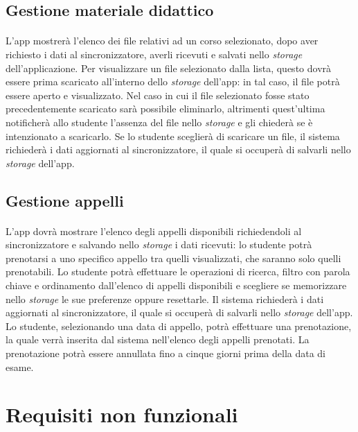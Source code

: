 \subsection{Gestione materiale didattico}
\paragraph{} 
L’app mostrerà l’elenco dei file relativi ad un corso selezionato, dopo aver richiesto i dati al sincronizzatore, averli ricevuti e salvati nello \textit{storage} dell’applicazione. Per visualizzare un file selezionato dalla lista, questo dovrà essere prima scaricato all’interno dello \textit{storage} dell’app: in tal caso, il file potrà essere aperto e visualizzato. Nel caso in cui il file selezionato fosse stato precedentemente scaricato sarà possibile eliminarlo, altrimenti quest’ultima notificherà allo studente l’assenza del file nello \textit{storage} e gli chiederà se è intenzionato a scaricarlo. Se lo studente sceglierà di scaricare un file, il sistema richiederà i dati aggiornati al sincronizzatore, il quale si occuperà di salvarli nello \textit{storage} dell’app.
\subsection{Gestione appelli}
\paragraph{} 
L’app dovrà mostrare l’elenco degli appelli disponibili richiedendoli al sincronizzatore e salvando nello \textit{storage} i dati ricevuti: lo studente potrà prenotarsi a uno specifico appello tra quelli visualizzati, che saranno solo quelli prenotabili. Lo studente potrà effettuare le operazioni di ricerca, filtro con parola chiave e ordinamento dall'elenco di appelli disponibili e scegliere se memorizzare nello \textit{storage} le sue preferenze oppure resettarle. Il sistema richiederà i dati aggiornati al sincronizzatore, il quale si occuperà di salvarli nello \textit{storage} dell’app. Lo studente, selezionando una data di appello, potrà effettuare una prenotazione, la quale verrà inserita dal sistema nell’elenco degli appelli prenotati. La prenotazione potrà essere annullata fino a cinque giorni prima della data di esame.


\section{Requisiti non funzionali}

